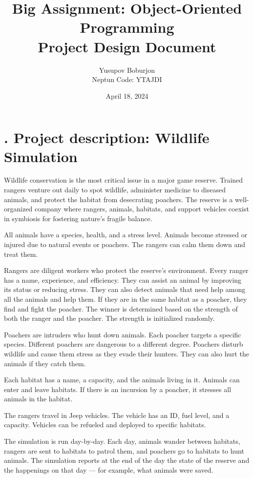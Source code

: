 \documentclass[a4paper,12pt]{article}
\title{Big Assignment: Object-Oriented Programming\\\large Project Design Document}
\author{Yusupov Boburjon\\Neptun Code: YTAJDI}
\date{April 18, 2024}
\begin{document}
\maketitle

\newpage

\section*{. Project description: Wildlife Simulation}

Wildlife conservation is the most critical issue in a major game reserve.  
Trained rangers venture out daily to spot wildlife, administer medicine to diseased animals, and protect the habitat from desecrating poachers. The reserve is a well-organized company where rangers, animals, habitats, and support vehicles coexist in symbiosis for fostering nature’s fragile balance.

All animals have a species, health, and a stress level. Animals become stressed or injured due to natural events or poachers. The rangers can calm them down and treat them.

Rangers are diligent workers who protect the reserve’s environment. Every ranger has a name, experience, and efficiency. They can assist an animal by improving its status or reducing stress. They can also detect animals that need help among all the animals and help them. If they are in the same habitat as a poacher, they find and fight the poacher. The winner is determined based on the strength of both the ranger and the poacher. The strength is initialized randomly.

Poachers are intruders who hunt down animals. Each poacher targets a specific species. Different poachers are dangerous to a different degree. Poachers disturb wildlife and cause them stress as they evade their hunters. They can also hurt the animals if they catch them.

Each habitat has a name, a capacity, and the animals living in it. Animals can enter and leave habitats. If there is an incursion by a poacher, it stresses all animals in the habitat.

The rangers travel in Jeep vehicles. The vehicle has an ID, fuel level, and a capacity. Vehicles can be refueled and deployed to specific habitats.

The simulation is run day-by-day. Each day, animals wander between habitats, rangers are sent to habitats to patrol them, and poachers go to habitats to hunt animals. The simulation reports at the end of the day the state of the reserve and the happenings on that day — for example, what animals were saved.
\end{document}
